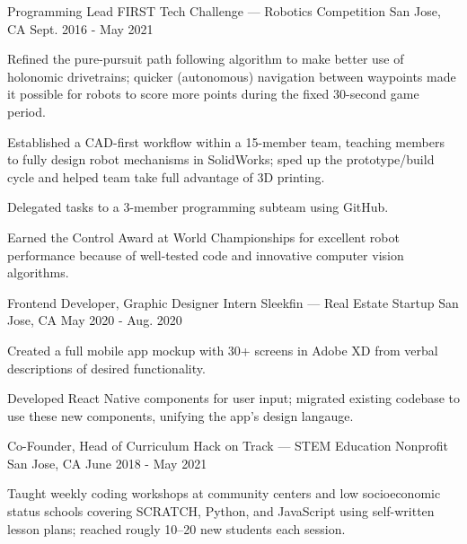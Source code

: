 
\begin{cventries}
  \cventry
  {Programming Lead} %
  {FIRST Tech Challenge --- Robotics Competition} %
  {San Jose, CA} %
  {Sept. 2016 - May 2021} %
  {
    \begin{cvitems} %
      \item {Refined the pure-pursuit path following algorithm to make better use of holonomic drivetrains; quicker (autonomous) navigation between waypoints made it possible for robots to score more points during the fixed 30-second game period.}
      \item {Established a CAD-first workflow within a 15-member team, teaching members to fully design robot mechanisms in SolidWorks; sped up the prototype/build cycle and helped team take full advantage of 3D printing.}
      \item {Delegated tasks to a 3-member programming subteam using GitHub.}
      \item {Earned the Control Award at World Championships for excellent robot performance because of well-tested code and innovative computer vision algorithms.}
    \end{cvitems}
  }

  \cventry
  {Frontend Developer, Graphic Designer Intern} %
  {Sleekfin --- Real Estate Startup} %
  {San Jose, CA} %
  {May 2020 - Aug. 2020} %
  {
    \begin{cvitems} %
      \item {Created a full mobile app mockup with 30+ screens in Adobe XD from verbal descriptions of desired functionality.}
      \item {Developed React Native components for user input; migrated existing codebase to use these new components, unifying the app's design langauge.}
    \end{cvitems}
  }

  \cventry
  {Co-Founder, Head of Curriculum} %
  {Hack on Track --- STEM Education Nonprofit} %
  {San Jose, CA} %
  {June 2018 - May 2021} %
  {
    \begin{cvitems} %
      \item {Taught weekly coding workshops at community centers and low socioeconomic status schools covering SCRATCH, Python, and JavaScript using self-written lesson plans; reached rougly 10--20 new students each session.}
    \end{cvitems}
  }
\end{cventries}

